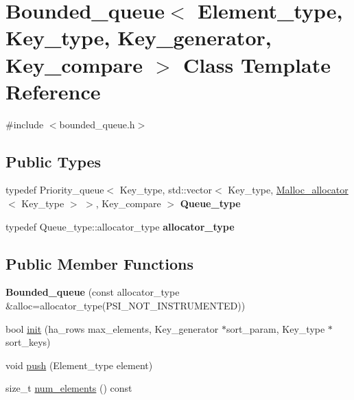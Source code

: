 \hypertarget{classBounded__queue}{}\section{Bounded\+\_\+queue$<$ Element\+\_\+type, Key\+\_\+type, Key\+\_\+generator, Key\+\_\+compare $>$ Class Template Reference}
\label{classBounded__queue}


{\ttfamily \#include $<$bounded\+\_\+queue.\+h$>$}

\subsection*{Public Types}
\begin{DoxyCompactItemize}
\item 
\mbox{\label{classBounded__queue_a5452fcd0d9a1a1f6af2eded1706126ed}} 
typedef Priority\+\_\+queue$<$ Key\+\_\+type, std\+::vector$<$ Key\+\_\+type, \mbox{\hyperlink{classMalloc__allocator}{Malloc\+\_\+allocator}}$<$ Key\+\_\+type $>$ $>$, Key\+\_\+compare $>$ {\bfseries Queue\+\_\+type}
\item 
\mbox{\label{classBounded__queue_a639c876a698f4104e9e15964935b0da2}} 
typedef Queue\+\_\+type\+::allocator\+\_\+type {\bfseries allocator\+\_\+type}
\end{DoxyCompactItemize}
\subsection*{Public Member Functions}
\begin{DoxyCompactItemize}
\item 
\mbox{\label{classBounded__queue_a06c121bc377907b33baab4bd1d4b4fff}} 
{\bfseries Bounded\+\_\+queue} (const allocator\+\_\+type \&alloc=allocator\+\_\+type(P\+S\+I\+\_\+\+N\+O\+T\+\_\+\+I\+N\+S\+T\+R\+U\+M\+E\+N\+T\+ED))
\item 
bool \mbox{\hyperlink{classBounded__queue_aff5e3f52cd3f4224fd3368883310a9b9}{init}} (ha\+\_\+rows max\+\_\+elements, Key\+\_\+generator $\ast$sort\+\_\+param, Key\+\_\+type $\ast$sort\+\_\+keys)
\item 
void \mbox{\hyperlink{classBounded__queue_a745d7312ec6c57f47befd4ff75f54540}{push}} (Element\+\_\+type element)
\item 
size\+\_\+t \mbox{\hyperlink{classBounded__queue_a6990c2053a12d102653834a45865a9a2}{num\+\_\+elements}} () const
\end{DoxyCompactItemize}


